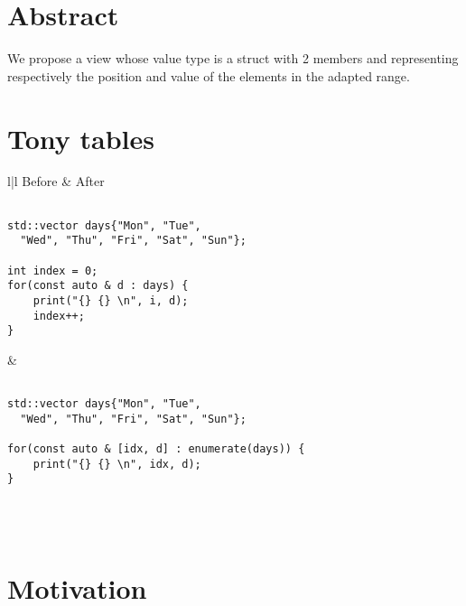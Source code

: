 \documentclass{wg21}
\title{\tcode{views::enumerate}}
\author{Corentin Jabot}{corentin.jabot@gmail.com}
\begin{document}
\maketitle


\section{Abstract}

We propose a view  whose value type is a struct with 2 members  and 
representing respectively the position and value of the elements in the adapted range. 

\section{Tony tables}
\begin{center}
\begin{tabular}{l|l}
Before & After\\ \hline

\begin{minipage}[t]{0.5\textwidth}
\begin{lstlisting}

std::vector days{"Mon", "Tue", 
  "Wed", "Thu", "Fri", "Sat", "Sun"};

int index = 0;
for(const auto & d : days) {
    print("{} {} \n", i, d);
    index++;
}

\end{lstlisting}
\end{minipage}
&
\begin{minipage}[t]{0.5\textwidth}
\begin{lstlisting}

std::vector days{"Mon", "Tue", 
  "Wed", "Thu", "Fri", "Sat", "Sun"};

for(const auto & [idx, d] : enumerate(days)) {
    print("{} {} \n", idx, d);
}

\end{lstlisting}
\end{minipage}
\\\\ \hline

\end{tabular}
\end{center}

\section{Motivation}
\end{document}
